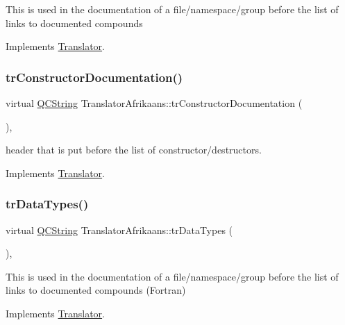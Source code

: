This is used in the documentation of a file/namespace/group before the list of links to documented compounds 

Implements \mbox{\hyperlink{class_translator}{Translator}}.

\mbox{\label{class_translator_afrikaans_a765479998fd85afa62468629dfde222c}} 
\subsubsection{\texorpdfstring{trConstructorDocumentation()}{trConstructorDocumentation()}}
{\footnotesize\ttfamily virtual \mbox{\hyperlink{class_q_c_string}{Q\+C\+String}} Translator\+Afrikaans\+::tr\+Constructor\+Documentation (\begin{DoxyParamCaption}{ }\end{DoxyParamCaption})\hspace{0.3cm}{\ttfamily [inline]}, {\ttfamily [virtual]}}

header that is put before the list of constructor/destructors. 

Implements \mbox{\hyperlink{class_translator}{Translator}}.

\mbox{\label{class_translator_afrikaans_ae6d24533661ffd83b295be2775710aeb}} 
\subsubsection{\texorpdfstring{trDataTypes()}{trDataTypes()}}
{\footnotesize\ttfamily virtual \mbox{\hyperlink{class_q_c_string}{Q\+C\+String}} Translator\+Afrikaans\+::tr\+Data\+Types (\begin{DoxyParamCaption}{ }\end{DoxyParamCaption})\hspace{0.3cm}{\ttfamily [inline]}, {\ttfamily [virtual]}}

This is used in the documentation of a file/namespace/group before the list of links to documented compounds (Fortran) 

Implements \mbox{\hyperlink{class_translator}{Translator}}.

